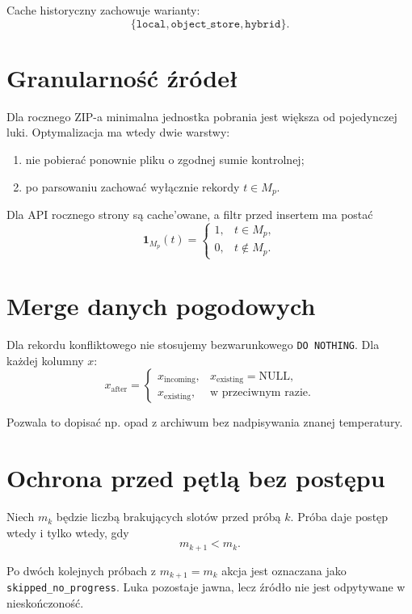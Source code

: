 \documentclass[11pt,a4paper]{article}
\begin{document}
Cache historyczny zachowuje warianty:
\[
 \{\texttt{local},\texttt{object\_store},\texttt{hybrid}\}.
\]

\section{Granularność źródeł}

Dla rocznego ZIP-a minimalna jednostka pobrania jest większa od pojedynczej
luki. Optymalizacja ma wtedy dwie warstwy:
\begin{enumerate}[nosep]
  \item nie pobierać ponownie pliku o zgodnej sumie kontrolnej;
  \item po parsowaniu zachować wyłącznie rekordy $t\in M_p$.
\end{enumerate}

Dla API rocznego strony są cache'owane, a filtr przed insertem ma postać
\[
  \mathbf{1}_{M_p}(t)=
  \begin{cases}
    1,& t\in M_p,\\
    0,& t\notin M_p.
  \end{cases}
\]

\section{Merge danych pogodowych}

Dla rekordu konfliktowego nie stosujemy bezwarunkowego \texttt{DO NOTHING}.
Dla każdej kolumny $x$:
\[
 x_{\mathrm{after}}=
 \begin{cases}
   x_{\mathrm{incoming}},&x_{\mathrm{existing}}=\mathrm{NULL},\\
   x_{\mathrm{existing}},&\text{w przeciwnym razie}.
 \end{cases}
\]

Pozwala to dopisać np. opad z archiwum bez nadpisywania znanej temperatury.

\section{Ochrona przed pętlą bez postępu}

Niech $m_k$ będzie liczbą brakujących slotów przed próbą $k$. Próba daje
postęp wtedy i tylko wtedy, gdy
\[
  m_{k+1}<m_k.
\]

Po dwóch kolejnych próbach z $m_{k+1}=m_k$ akcja jest oznaczana jako
\texttt{skipped\_no\_progress}. Luka pozostaje jawna, lecz źródło nie jest
odpytywane w nieskończoność.
\end{document}
